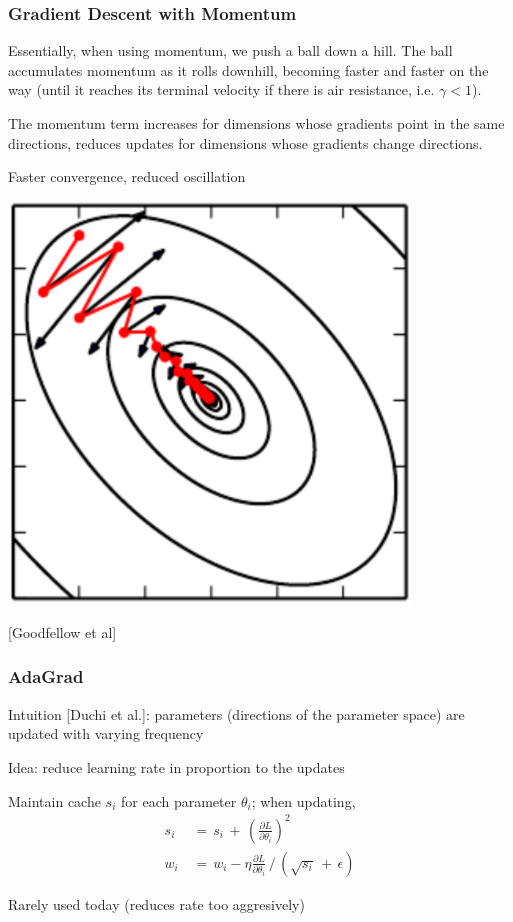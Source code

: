 \documentclass[xcolor=dvipsnames]{beamer}
\begin{document}
      \begin{frame}
   \frametitle{Gradient Descent with Momentum}
 \bi
 \item Essentially, when using momentum, we push a ball down a hill. The ball accumulates momentum as it rolls downhill, becoming faster and faster on the way (until it reaches its terminal velocity if there is air resistance, i.e. $\gamma < 1$). 
 \pause
 \item The momentum term increases for dimensions whose gradients
   point in the same directions, reduces updates for dimensions whose
   gradients change directions. 
\ei
\begin{minipage}[c]{.6\linewidth}
\bi
\item Faster convergence, reduced oscillation  
\ei
\end{minipage}%
\begin{minipage}[c]{.4\linewidth}
  \includegraphics[width=0.8\textwidth]{gcb-sgd-momentum}

[Goodfellow et al]

\end{minipage}
 \end{frame}


 \begin{frame}
   \frametitle{AdaGrad}
\bi
\item Intuition [Duchi et al.]: parameters (directions of the parameter space)
  are updated with varying frequency
\item Idea: reduce learning rate in proportion to the updates
\item Maintain cache $s_i$ for each parameter $\theta_i$; when updating,
\begin{align*}
s_i\,&=\,s_i\,+\,\left(\frac{\partial L}{\partial \theta_i}\right)^2\\
w_i\,&=\,w_i-\eta \frac{\partial L}{\partial \theta_i}\,/\,
\left(\sqrt{s_i}\,+\,\epsilon\right)
\end{align*}
\item Rarely used today (reduces rate too aggresively)
\ei
 \end{frame}
\end{document}
